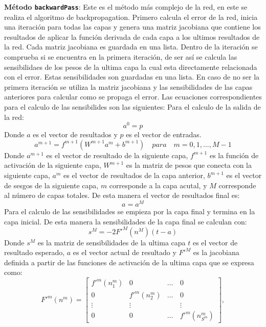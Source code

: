 \documentclass{article}
\begin{document}
\textbf{Método \texttt{backwardPass}}: Este es el método más complejo de la red, en este se realiza el algoritmo de backpropagation. Primero calcula el error de la red, inicia una iteración para todas las capas y genera una matriz jacobiana que contiene
los resultados de aplicar la función derivada de cada capa a los ultimos resultados de la red. Cada matriz jacobiana es guardada en una lista. 
Dentro de la iteración se comprueba si se encuentra en la primera iteración, de ser así se calcula las sensibilidaes de los pesos de la ultima capa la cual esta directamente relacionada con el error. Estas sensibilidades son guardadas en una lista. 
En caso de no ser la primera iteración se utiliza la matriz jacobiana y las sensibilidades de las capas anteriores para calcular como se propaga el error.
Las ecuaciones correspondientes para el calculo de las sensibilides son las siguientes: 
Para el calculo de la salida de la red:
\begin{equation}
    a^0 = p
\end{equation}
Donde $a$ es el vector de resultados y $p$ es el vector de entradas. 
\begin{equation}
    a^{m+1} = f^{m+1}(W^{m+1}a^m + b^{m+1}) \hspace{1em} para \hspace{1em} m = 0, 1, ..., M -1
\end{equation}
Donde $a^{m+1}$ es el vector de resultado de la siguiente capa, $f^{m+1}$ es la función de activación de la siguiente capa, $W^{m+1}$ es la matriz de pesos que conecta con la siguiente capa,
$a^m$ es el vector de resultados de la capa anterior, $b^{m+1}$ es el vector de sesgos de la siguiente capa, $m$ corresponde a la capa acutal, y $M$ corresponde al número de capas totales.
De esta manera el vector de resultados final es:
\begin{equation}
    a = a^M
\end{equation}
Para el calculo de las sensibilidades se empieza por la capa final y termina en la capa inicial. De esta manera la sensibilidades de la capa final se calculan con:
\begin{equation}
    s^M  = -2F'^M(n^M)(t-a)
\end{equation}
Donde $s^M$ es la matriz de sensibilidades de la ultima capa $t$ es el vector de resultado esperado, $a$ es el vector actual de resultado y  $F'^M$ es la jacobiana definida a partir de las funciones de activación de la ultima capa que se expresa como: 
\begin{equation}
    F'^m(n^m) = \begin{bmatrix}
        f'^m(n_1^m) &  0 & \dots &  0     \\
        0 & f'^m(n_2^m) & \dots & 0 \\ 
        \vdots & \vdots & \hspace{1em} & \vdots \\
        0 & 0 & \dots & f'^m(n_{S^m}^m)
    \end{bmatrix} ,
\end{equation}
\end{document}
